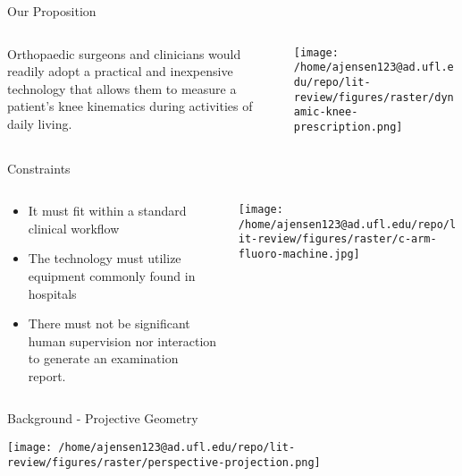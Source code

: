 \documentclass[presentation, aspectratio=1610]{beamer}
\begin{document}
\begin{frame}[label={sec:org670abe6}]{Our Proposition}
\begin{columns}
\begin{column}{0.5\columnwidth}
Orthopaedic surgeons and clinicians would readily adopt a \alert{\alert{practical}} and \alert{\alert{inexpensive}} technology that allows them to \alert{\alert{measure}} a patient's knee kinematics during \alert{\alert{activities of daily living}}.
\end{column}
\begin{column}{0.55\columnwidth}
\begin{center}
\texttt{[image: /home/ajensen123@ad.ufl.edu/repo/lit-review/figures/raster/dynamic-knee-prescription.png]}
\end{center}
\end{column}
\end{columns}
\end{frame}
\begin{frame}[label={sec:orga9b6d55}]{Constraints}
\begin{columns}
\begin{column}{0.45\columnwidth}
\begin{itemize}
\item It must fit within a \alert{\alert{standard clinical workflow}}
\item The technology must utilize equipment \alert{\alert{commonly found in hospitals}}
\item There must not be significant \alert{\alert{human supervision}} nor interaction to generate an examination report.
\end{itemize}
\end{column}
\begin{column}{0.55\columnwidth}
\begin{center}
\texttt{[image: /home/ajensen123@ad.ufl.edu/repo/lit-review/figures/raster/c-arm-fluoro-machine.jpg]}
\end{center}
\end{column}
\end{columns}
\end{frame}
\begin{frame}[label={sec:orgf9fa086}]{Background - Projective Geometry}
\begin{center}
\texttt{[image: /home/ajensen123@ad.ufl.edu/repo/lit-review/figures/raster/perspective-projection.png]}
\end{center}
\end{frame}
\end{document}
